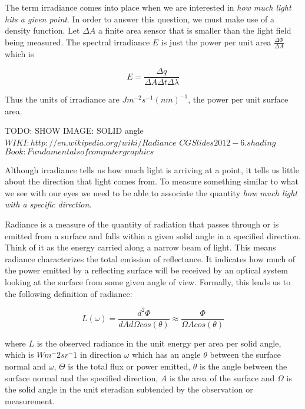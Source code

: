 The term irradiance comes into place when we are interested in \textit{how much light hits a given point}. In order to answer this question, we must make use of a density function. Let $\Delta A$ a finite area sensor that is smaller than the light field being measured. The spectral irradiance $E$ is just the power per unit area $\frac{\Delta \Phi}{\Delta A}$ which is 

\begin{equation}
 E = \frac{\Delta q}{\Delta A \Delta t \Delta \lambda}
\end{equation}

Thus the units of irradiance are $Jm^{-2}s^{-1}(nm)^{-1}$, the power per unit surface area.


TODO: SHOW IMAGE: SOLID angle
$WIKI: http://en.wikipedia.org/wiki/Radiance$
$CG Slides 2012 - 6.shading$
$Book: Fundamentals of computer graphics$

Although irradiance tells us how much light is arriving at a point, it tells us little about the direction that light comes from. To measure something similar to what we see with our eyes we need to be able to associate the quantity \textit{how much light with a specific direction}. 

Radiance is a measure of the quantity of radiation that passes through or is emitted from a surface and falls within a given solid angle in a specified direction. Think of it as the energy carried along a narrow beam of light. 
This means radiance characterizes the total emission of reflectance. It indicates how much of the power emitted by a reflecting surface will be received by an optical system looking at the surface from some given angle of view. Formally, this leads us to the following definition of radiance: 

\begin{equation}
 L(\omega) = \frac{d^2 \Phi}{dA d\Omega cos(\theta)} \approx \frac{\Phi}{\Omega A cos(\theta)}
\end{equation}

where $L$ is the observed radiance in the unit energy per area per solid angle, which is $Wm^-2 sr^-1$ in direction $\omega$ which has an angle $\theta$ between the surface normal and $\omega$, $\Theta$ is the total flux or power emitted, $\theta$ is the angle between the surface normal and the specified direction, $A$ is the area of the surface and $\Omega$ is the solid angle in the unit steradian subtended by the observation or measurement.

